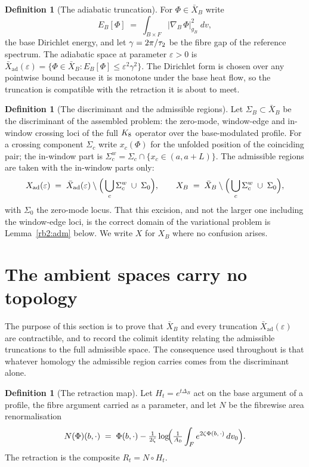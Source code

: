 \documentclass[11pt]{article}
\numberwithin{equation}{section}
\theoremstyle{plain}
\theoremstyle{definition}
\newtheorem{definition}[theorem]{Definition}
\theoremstyle{remark}
\newcommand{\Xad}{X_{\mathrm{ad}}}
\newcommand{\Xbad}{\bar{X}_{\mathrm{ad}}}
\begin{document}
\begin{definition}[The adiabatic truncation]\label{rb:trunc}
For $\Phi \in \bar{X}_{B}$ write
\[
E_{B}[\Phi] \;=\; \int_{B \times F}
\bigl|\nabla_{\!B}\,\Phi\bigr|^{2}_{g_{B}}\; dv ,
\]
the base Dirichlet energy, and let $\gamma = 2\pi/\tau_2$ be the
fibre gap of the reference spectrum. The adiabatic space at
parameter $\varepsilon > 0$ is
$\Xbad(\varepsilon) = \{\Phi \in \bar{X}_{B} :
E_{B}[\Phi] \leq \varepsilon^{2}\gamma^{2}\}$. The Dirichlet form
is chosen over any pointwise bound because it is monotone under the
base heat flow, so the truncation is compatible with the retraction
it is about to meet.
\end{definition}

\begin{definition}[The discriminant and the admissible
regions]\label{rb:adm}
Let $\Sigma_{B} \subset \bar{X}_{B}$ be the discriminant of the
assembled problem: the zero-mode, window-edge and in-window
crossing loci of the full $K_8$ operator over the
base-modulated profile. For a crossing component $\Sigma_{c}$ write
$x_{c}(\Phi)$ for the unfolded position of the coinciding pair; the
in-window part is
$\Sigma_{c}^{w} = \Sigma_{c} \cap \{x_{c} \in (a, a+L)\}$. The
admissible regions are taken with the in-window parts only:
\[
\Xad(\varepsilon) \;=\; \Xbad(\varepsilon) \setminus
\Bigl(\,\bigcup_{c}\Sigma_{c}^{w} \;\cup\; \Sigma_{0}\Bigr),
\qquad
X_{B} \;=\; \bar{X}_{B} \setminus
\Bigl(\,\bigcup_{c}\Sigma_{c}^{w} \;\cup\; \Sigma_{0}\Bigr),
\]
with $\Sigma_{0}$ the zero-mode locus. That this excision, and not
the larger one including the window-edge loci, is the correct
domain of the variational problem is Lemma~\ref{rb2:adm} below. We
write $X$ for $X_{B}$ where no confusion arises.
\end{definition}

\section{The ambient spaces carry no topology}\label{sec:ambient}

The purpose of this section is to prove that $\bar{X}_{B}$ and
every truncation $\Xbad(\varepsilon)$ are contractible, and to
record the colimit identity relating the admissible truncations to
the full admissible space. The consequence used throughout is that
whatever homology the admissible region carries comes from the
discriminant alone.

\begin{definition}[The retraction map]\label{rb:retraction}
Let $H_{t} = e^{t\Delta_{B}}$ act on the base argument of a
profile, the fibre argument carried as a parameter, and let $N$ be
the fibrewise area renormalisation
\[
N(\Phi)(b, \cdot) \;=\; \Phi(b, \cdot) - \tfrac{1}{2\zeta}
\log\!\Bigl(\tfrac{1}{A_{0}}\int_{F}
e^{2\zeta\Phi(b,\,\cdot)}\,dv_{0}\Bigr).
\]
The retraction is the composite $R_{t} = N \circ H_{t}$.
\end{definition}
\end{document}
